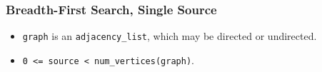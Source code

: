 \subsubsection{Breadth-First Search, Single Source}


{\small
      
}

\begin{itemdescr}
      \pnum\mandates
            \begin{itemize}
                  \item
                        \lstinline{graph} is an \lstinline{adjacency_list}, which may be directed or undirected.
            \end{itemize}
      \pnum\preconditions
            \begin{itemize}
                  \item
                        \lstinline{0 <= source < num_vertices(graph)}.


\end{itemize}
\end{itemdescr}
